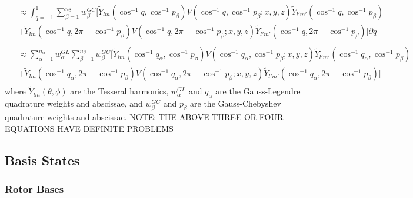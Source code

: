 \documentclass{revtex4-1}
\begin{document}
\begin{align}
											 \begin{split} &\approx\int_{q=-1}^{1}\sum_{\beta=1}^{n_{\beta}}w^{GC}_{\beta}\lbrack\widetilde{Y}_{lm}(\cos^{-1}q, \cos^{-1}p_{\beta})V(\cos^{-1}q, \cos^{-1}p_{\beta}; x,y,z)\widetilde{Y}_{l'm'}(\cos^{-1}q, \cos^{-1}p_{\beta}) \\&+ \widetilde{Y}_{lm}(\cos^{-1}q, 2\pi-\cos^{-1}p_{\beta})V(\cos^{-1}q, 2\pi-\cos^{-1}p_{\beta}; x,y,z)\widetilde{Y}_{l'm'}(\cos^{-1}q, 2\pi-\cos^{-1}p_{\beta})\rbrack \partial q \end{split}\\
											 \begin{split} &\approx\sum_{\alpha=1}^{n_{\alpha}}w^{GL}_{\alpha}\sum_{\beta=1}^{n_{\beta}}w^{GC}_{\beta}\lbrack\widetilde{Y}_{lm}(\cos^{-1}q_{\alpha}, \cos^{-1}p_{\beta})V(\cos^{-1}q_{\alpha}, \cos^{-1}p_{\beta}; x,y,z)\widetilde{Y}_{l'm'}(\cos^{-1}q_{\alpha}, \cos^{-1}p_{\beta}) \\&+ \widetilde{Y}_{lm}(\cos^{-1}q_{\alpha}, 2\pi-\cos^{-1}p_{\beta})V(\cos^{-1}q_{\alpha}, 2\pi-\cos^{-1}p_{\beta}; x,y,z)\widetilde{Y}_{l'm'}(\cos^{-1}q_{\alpha}, 2\pi-\cos^{-1}p_{\beta})\rbrack \end{split}
\end{align} 
where $\widetilde{Y}_{lm}(\theta,\phi)$ are the Tesseral harmonics, $w^{GL}_{\alpha}$ and $q_{\alpha}$ are the Gauss-Legendre quadrature weights and abscissae, and $w^{GC}_{\beta}$ and $p_{\beta}$ are the Gauss-Chebyshev quadrature weights and abscissae.  NOTE: THE ABOVE THREE OR FOUR EQUATIONS HAVE DEFINITE PROBLEMS

\subsection{Basis States}\label{S:BS}
\subsubsection{Rotor Bases}\label{S:RotBS}
\end{document}
